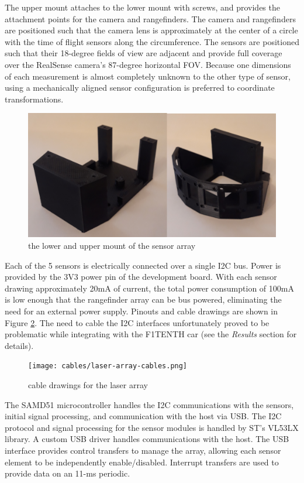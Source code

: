 \documentclass[conference]{IEEEtran}
\begin{document}
The upper mount attaches to the lower mount with screws, and provides the
attachment points for the camera and rangefinders. The camera and rangefinders
are positioned such that the camera lens is approximately at the center of a
circle with the time of flight sensors along the circumference. The sensors are
positioned such that their 18-degree fields of view are adjacent and provide
full coverage over the RealSense camera's 87-degree horizontal FOV. Because one
dimensions of each measurement is almost completely unknown to the other type
of sensor, using a mechanically aligned sensor configuration is preferred to
coordinate transformations.

\begin{figure}
\centering
\includegraphics[scale=0.20]{split-mount.png}
\caption{the lower and upper mount of the sensor array}
\label{fig:split-mount}
\end{figure}

Each of the 5 sensors is electrically connected over a single I2C bus. Power is
provided by the 3V3 power pin of the development board. With each sensor
drawing approximately 20mA of current, the total power consumption of 100mA is
low enough that the rangefinder array can be bus powered, eliminating the need
for an external power supply. Pinouts and cable drawings are shown in Figure
\ref{fig:cable-drawings}. The need to cable the I2C interfaces unfortunately
proved to be problematic while integrating with the F1TENTH car (see the
\textit{Results} section for details).

\begin{figure}
\centering
\texttt{[image: cables/laser-array-cables.png]}
\caption{cable drawings for the laser array}
\label{fig:cable-drawings}
\end{figure}

The SAMD51 microcontroller handles the I2C communications with the sensors,
initial signal processing, and communication with the host via USB. The I2C
protocol and signal processing for the sensor modules is handled by ST's VL53LX
library. A custom USB driver handles communications with the host. The USB
interface provides control transfers to manage the array, allowing each sensor
element to be independently enable/disabled. Interrupt transfers are used to
provide data on an 11-ms periodic.
\end{document}
